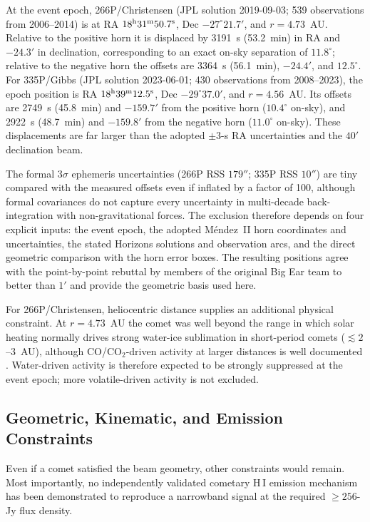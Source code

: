 \documentclass[crop]{CSL}
\begin{document}
At the event epoch, 266P/Christensen (JPL solution 2019-09-03; 539 observations from 2006--2014) is at RA $18^{\rm h}31^{\rm m}50.7^{\rm s}$, Dec $-27^\circ21.7'$, and $r=4.73$~AU. Relative to the positive horn it is displaced by 3191~s (53.2~min) in RA and $-24.3'$ in declination, corresponding to an exact on-sky separation of $11.8^\circ$; relative to the negative horn the offsets are 3364~s (56.1~min), $-24.4'$, and $12.5^\circ$. For 335P/Gibbs (JPL solution 2023-06-01; 430 observations from 2008--2023), the epoch position is RA $18^{\rm h}39^{\rm m}12.5^{\rm s}$, Dec $-29^\circ37.0'$, and $r=4.56$~AU. Its offsets are 2749~s (45.8~min) and $-159.7'$ from the positive horn ($10.4^\circ$ on-sky), and 2922~s (48.7~min) and $-159.8'$ from the negative horn ($11.0^\circ$ on-sky). These displacements are far larger than the adopted $\pm3$-s RA uncertainties and the $40'$ declination beam.

The formal $3\sigma$ ephemeris uncertainties (266P RSS $179''$; 335P RSS $10''$) are tiny compared with the measured offsets even if inflated by a factor of 100, although formal covariances do not capture every uncertainty in multi-decade back-integration with non-gravitational forces. The exclusion therefore depends on four explicit inputs: the event epoch, the adopted M\'endez~II horn coordinates and uncertainties, the stated Horizons solutions and observation arcs, and the direct geometric comparison with the horn error boxes. The resulting positions agree with the point-by-point rebuttal by members of the original Big Ear team \citep{naapo2017} to better than $1'$ and provide the geometric basis used here.

For 266P/Christensen, heliocentric distance supplies an additional physical constraint. At $r=4.73$~AU the comet was well beyond the range in which solar heating normally drives strong water-ice sublimation in short-period comets ($\lesssim2$--3~AU), although CO/CO$_2$-driven activity at larger distances is well documented \citep{gicquel2023}. Water-driven activity is therefore expected to be strongly suppressed at the event epoch; more volatile-driven activity is not excluded.

\subsection{Geometric, Kinematic, and Emission Constraints}

Even if a comet satisfied the beam geometry, other constraints would remain. Most importantly, no independently validated cometary H\,I emission mechanism has been demonstrated to reproduce a narrowband signal at the required $\geq256$-Jy flux density.
\end{document}
